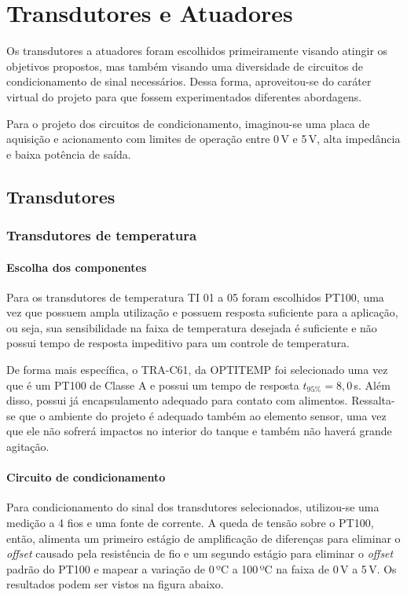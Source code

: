 \section{Transdutores e Atuadores}

Os transdutores a atuadores foram escolhidos primeiramente visando atingir os objetivos propostos, mas também visando uma diversidade de circuitos de condicionamento de sinal necessários. Dessa forma, aproveitou-se do caráter virtual do projeto para que fossem experimentados diferentes abordagens.

Para o projeto dos circuitos de condicionamento, imaginou-se uma placa de aquisição e acionamento com limites de operação entre 0\,V e 5\,V, alta impedância e baixa potência de saída.

\subsection{Transdutores}

\subsubsection{Transdutores de temperatura}

\paragraph{Escolha dos componentes}\mbox{}

Para os transdutores de temperatura TI 01 a 05 foram escolhidos PT100, uma vez que possuem ampla utilização e possuem resposta suficiente para a aplicação, ou seja, sua sensibilidade na faixa de temperatura desejada é suficiente e não possui tempo de resposta impeditivo para um controle de temperatura.

De forma mais específica, o TRA-C61, da OPTITEMP foi selecionado uma vez que é um PT100 de Classe A e possui um tempo de resposta $t_{95\%} = 8,0$\,s. Além disso, possui já encapsulamento adequado para contato com alimentos. Ressalta-se que o ambiente do projeto é adequado também ao elemento sensor, uma vez que ele não sofrerá impactos no interior do tanque e também não haverá grande agitação.

\paragraph{Circuito de condicionamento}\mbox{}

Para condicionamento do sinal dos transdutores selecionados, utilizou-se uma medição a 4 fios e uma fonte de corrente. A queda de tensão sobre o PT100, então, alimenta um primeiro estágio de amplificação de diferenças para eliminar o \emph{offset} causado pela resistência de fio e um segundo estágio para eliminar o \emph{offset} padrão do PT100 e mapear a variação de 0\,ºC a 100\,ºC na faixa de 0\,V a 5\,V. Os resultados podem ser vistos na figura abaixo.

